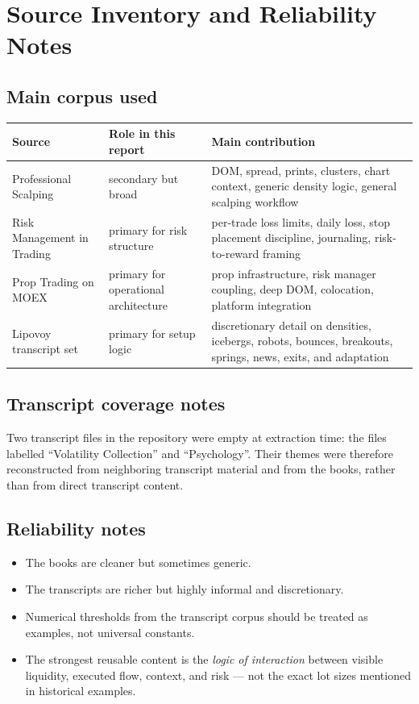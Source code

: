 \section{Source Inventory and Reliability Notes}

\subsection{Main corpus used}

\begin{longtable}{p{}p{}p{}}
\toprule
\textbf{Source} & \textbf{Role in this report} & \textbf{Main contribution} \\
\midrule
Professional Scalping & secondary but broad & DOM, spread, prints, clusters, chart context, generic density logic, general scalping workflow \\
Risk Management in Trading & primary for risk structure & per-trade loss limits, daily loss, stop placement discipline, journaling, risk-to-reward framing \\
Prop Trading on MOEX & primary for operational architecture & prop infrastructure, risk manager coupling, deep DOM, colocation, platform integration \\
Lipovoy transcript set & primary for setup logic & discretionary detail on densities, icebergs, robots, bounces, breakouts, springs, news, exits, and adaptation \\
\bottomrule
\end{longtable}

\subsection{Transcript coverage notes}

Two transcript files in the repository were empty at extraction time: the files labelled ``Volatility Collection'' and ``Psychology''. Their themes were therefore reconstructed from neighboring transcript material and from the books, rather than from direct transcript content.

\subsection{Reliability notes}

\begin{itemize}
\item The books are cleaner but sometimes generic.
\item The transcripts are richer but highly informal and discretionary.
\item Numerical thresholds from the transcript corpus should be treated as examples, not universal constants.
\item The strongest reusable content is the \emph{logic of interaction} between visible liquidity, executed flow, context, and risk --- not the exact lot sizes mentioned in historical examples.
\end{itemize}

